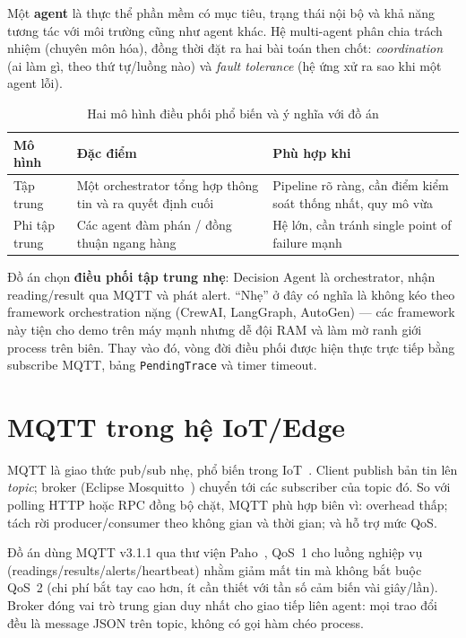 \documentclass[12pt,a4paper,oneside]{report}
\newcommand{\code}[1]{\texttt{#1}}
\begin{document}
Một \textbf{agent} là thực thể phần mềm có mục tiêu, trạng thái nội bộ và khả năng tương tác với môi trường cũng như agent khác. Hệ multi-agent phân chia trách nhiệm (chuyên môn hóa), đồng thời đặt ra hai bài toán then chốt: \textit{coordination} (ai làm gì, theo thứ tự/luồng nào) và \textit{fault tolerance} (hệ ứng xử ra sao khi một agent lỗi).

\begin{table}[htbp]
  \centering
  \caption{Hai mô hình điều phối phổ biến và ý nghĩa với đồ án}
  \label{tab:orchestration-models}
  \begin{tabular}{p{2.6cm}p{5.0cm}p{5.4cm}}
    \toprule
    \textbf{Mô hình} & \textbf{Đặc điểm} & \textbf{Phù hợp khi} \\
    \midrule
    Tập trung & Một orchestrator tổng hợp thông tin và ra quyết định cuối & Pipeline rõ ràng, cần điểm kiểm soát thống nhất, quy mô vừa \\
    Phi tập trung & Các agent đàm phán / đồng thuận ngang hàng & Hệ lớn, cần tránh single point of failure mạnh \\
    \bottomrule
  \end{tabular}
\end{table}

Đồ án chọn \textbf{điều phối tập trung nhẹ}: Decision Agent là orchestrator, nhận reading/result qua MQTT và phát alert. ``Nhẹ'' ở đây có nghĩa là không kéo theo framework orchestration nặng (CrewAI, LangGraph, AutoGen) --- các framework này tiện cho demo trên máy mạnh nhưng dễ đội RAM và làm mờ ranh giới process trên biên. Thay vào đó, vòng đời điều phối được hiện thực trực tiếp bằng subscribe MQTT, bảng \code{PendingTrace} và timer timeout.

\section{MQTT trong hệ IoT/Edge}

MQTT là giao thức pub/sub nhẹ, phổ biến trong IoT~\cite{oasis-mqtt}. Client publish bản tin lên \textit{topic}; broker (Eclipse Mosquitto~\cite{mosquitto}) chuyển tới các subscriber của topic đó. So với polling HTTP hoặc RPC đồng bộ chặt, MQTT phù hợp biên vì: overhead thấp; tách rời producer/consumer theo không gian và thời gian; và hỗ trợ mức QoS.

Đồ án dùng MQTT v3.1.1 qua thư viện Paho~\cite{paho-mqtt}, QoS~1 cho luồng nghiệp vụ (readings/results/alerts/heartbeat) nhằm giảm mất tin mà không bắt buộc QoS~2 (chi phí bắt tay cao hơn, ít cần thiết với tần số cảm biến vài giây/lần). Broker đóng vai trò trung gian duy nhất cho giao tiếp liên agent: mọi trao đổi đều là message JSON trên topic, không có gọi hàm chéo process.
\end{document}
